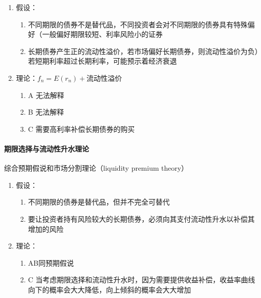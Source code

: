 \documentclass[12pt]{book}
\begin{document}
\begin{enumerate}[1.]
    \item 假设：
          \begin{enumerate}[(1)]
              \item 不同期限的债券不是替代品，不同投资者会对不同期限的债券具有特殊偏好（一般偏好期限较短、利率风险小的证券
              \item 长期债券产生正的流动性溢价，若市场偏好长期债券，则流动性溢价为负）若短期利率超过长期利率，可能预示着经济衰退
          \end{enumerate}
    \item 理论：$f_n=E\left(r_n\right)+\text{流动性溢价}$
          \begin{enumerate}[(1)]
              \item A 无法解释
              \item B 无法解释
              \item C 需要高利率补偿长期债券的购买
          \end{enumerate}
\end{enumerate}


\paragraph{期限选择与流动性升水理论}

综合预期假说和市场分割理论（liquidity premium theory）



\begin{enumerate}[1.]
    \item 假设：
          \begin{enumerate}[(1)]
              \item 不同期限的债券是替代品，但并不完全可替代
              \item 要让投资者持有风险较大的长期债券，必须向其支付流动性升水以补偿其增加的风险
          \end{enumerate}
    \item 理论：
          \begin{enumerate}[(1)]
              \item AB同预期假说
              \item C 当考虑期限选择和流动性升水时，因为需要提供收益补偿，收益率曲线向下的概率会大大降低，向上倾斜的概率会大大增加
          \end{enumerate}
\end{enumerate}
\end{document}
